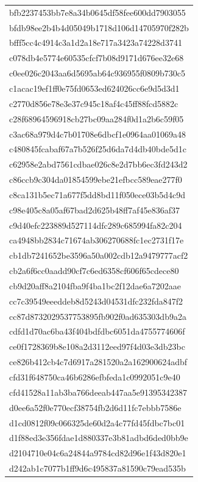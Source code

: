 \begin{tabular}{l}
bfb2237453bb7e8a34b0645df58fee600dd7903055 \\
bfdb98ee2b4b4d05049b1718d106d14705970f282b \\
bfff5cc4c4914c3a1d2a18e717a3423a74228d3741 \\
c078db4e5774e60535cfcf7b08d9171d676ee32e68 \\
c0ee026c2043aa6d5695ab64c936955f0809b730c5 \\
c1acac19ef1ff0e75fd0653ed624026cc6e9d5d3d1 \\
c2770d856e78e3e37c945c18af4c45ff88fcd5882c \\
c28f68964596918cb27bc09aa284f0d1a2b6c59f05 \\
c3ac68a979d4c7b01708e6dbcf1e0964aa01069a48 \\
c480845fcabaf67a7b526f25d6da7d4db40bde5d1c \\
c62958e2abd7561cdbae026c8e2d7bb6ec3fd243d2 \\
c86ccb9c304da01854599ebe21efbcc589eae277f0 \\
c8ca131b5ec71a677f5dd8bd11f050ece03b5d4c9d \\
c98e405c8a05af67bad2d625b48ff7af45e836af37 \\
c9d40efc223889d527114dfc289c685994fa82c204 \\
ca4948bb2834c71674ab306270688fc1ec2731f17e \\
cb1db7241652be3596a50a002cdb12a9479777acf2 \\
cb2a6f6cc0aadd90cf7c6ed6358cf606f65cdece80 \\
cb9d20aff8a2104fba9f4ba1bc2f12dae6a7202aae \\
cc7c39549eeeddeb8d5243d04531dfc232fda847f2 \\
cc87d8732029537753895fb902f0ad635303db9a2a \\
cdfd1d70ac6ba43f404bdfdbc6051da4755774606f \\
ce0f1728369b8e108a2d3112eed97f4d03e3db23bc \\
ce826b412cb4c7d6917a281520a2a162900624adbf \\
cfd31f648750ca46b6286efbfeda1c0992051c9e40 \\
cfd41528a11ab3ba766deeab447aa5e91395342387 \\
d0ee6a52f0e770ecf38754fb2d6d11fc7ebbb7586e \\
d1cd0812f09c066325de60d2a4c77fd45fdbc7bc01 \\
d1f88ed3e356fdae1d880337e3b81adbd6ded0bb9e \\
d2104710e04c6a24844a9784cd82d96e1f43d820e1 \\
d242ab1c7077b1ff9d6c495837a81590c79ead535b \\

\end{tabular}
